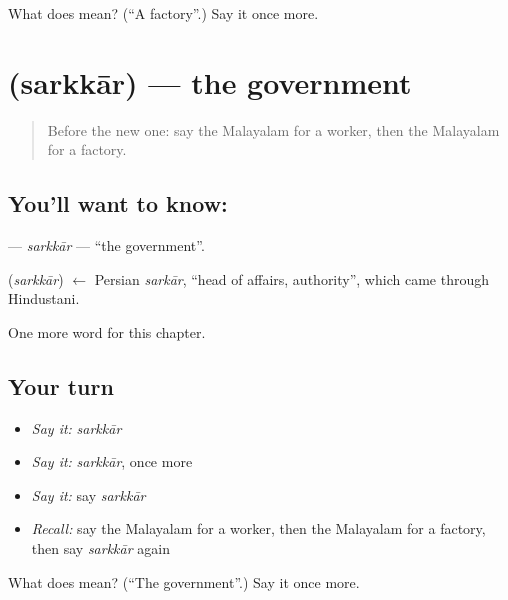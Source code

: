 \begin{tcolorbox}[breakable,colback=teal!4,colframe=teal!35!black,title={Before you move on}]
What does  mean? (\textquotedblleft{}A factory\textquotedblright{}.) Say it once more.
\end{tcolorbox}
\section[\texorpdfstring{\ml{സർക്കാർ} (sarkkār)}{സർക്കാർ (sarkkār)}]{ (sarkkār) — the government}

\label{lesson:ML-C299-sarkkar}



\begin{quote}
Before the new one: say the Malayalam for a worker, then the Malayalam for a factory.
\end{quote}

\subsection*{You'll want to know: }
\textbf{} — \emph{sarkkār} — \textquotedblleft{}the government\textquotedblright{}.

\begin{cousinweb}
\textbf{} (\emph{sarkkār}) $\leftarrow$ Persian \emph{sarkār}, \textquotedblleft{}head of affairs, authority\textquotedblright{}, which came through Hindustani.
\end{cousinweb}

\begin{grammarlens}[title={What you've built}]
One more word for this chapter.
\end{grammarlens}

\subsection*{Your turn}
\begin{itemize}
\raggedright
  \item \emph{Say it:} \emph{sarkkār}
  \item \emph{Say it:} \emph{sarkkār}, once more
  \item \emph{Say it:} say \emph{sarkkār}
  \item \emph{Recall:} say the Malayalam for a worker, then the Malayalam for a factory, then say \emph{sarkkār} again
\end{itemize}

\begin{tcolorbox}[breakable,colback=teal!4,colframe=teal!35!black,title={Before you move on}]
What does  mean? (\textquotedblleft{}The government\textquotedblright{}.) Say it once more.
\end{tcolorbox}
